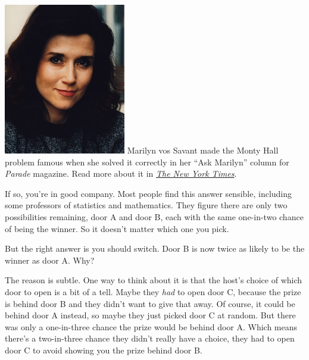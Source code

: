 \documentclass[justified]{tufte-book}
\theoremstyle{definition}
\theoremstyle{definition}
\theoremstyle{definition}
\theoremstyle{remark}
\begin{document}
\begin{marginfigure}
\includegraphics{img/marilyn_vos_savant.png} Marilyn vos Savant made the
Monty Hall problem famous when she solved it correctly in her ``Ask
Marilyn'' column for \emph{Parade} magazine. Read more about it in
\href{https://www.nytimes.com/1991/07/21/us/behind-monty-hall-s-doors-puzzle-debate-and-answer.html}{\emph{The
New York Times}}.
\end{marginfigure}

If so, you're in good company. Most people find this answer sensible,
including some professors of statistics and mathematics. They figure
there are only two possibilities remaining, door A and door B, each with
the same one-in-two chance of being the winner. So it doesn't matter
which one you pick.

But the right answer is you should switch. Door B is now twice as likely
to be the winner as door A. Why?

The reason is subtle. One way to think about it is that the host's
choice of which door to open is a bit of a tell. Maybe they \emph{had}
to open door C, because the prize is behind door B and they didn't want
to give that away. Of course, it could be behind door A instead, so
maybe they just picked door C at random. But there was only a
one-in-three chance the prize would be behind door A. Which means
there's a two-in-three chance they didn't really have a choice, they had
to open door C to avoid showing you the prize behind door B.
\end{document}
